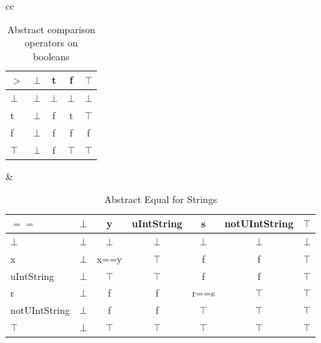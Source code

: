\begin{table}[htbp]
\begin{tabular}{cc}
{\begin{tabular}{l|cccc}
$>$    & $\bot$ & t      & f      & $\top$ \\\hline
$\bot$ & $\bot$ & $\bot$ & $\bot$ & $\bot$ \\
t      & $\bot$ & f      & t      & $\top$ \\
f      & $\bot$ & f      & f      & f \\
$\top$ & $\bot$ & f      & $\top$ & $\top$
\end{tabular}
} &
\end{tabular}
\caption{Abstract comparison operators on booleans}
\end{table}

\begin{table}[htbp]
\centering
\begin{tabular}{l|cccccc}
$==$          & $\bot$ & y      & uIntString & s      & notUIntString & $\top$ \\\hline
$\bot$        & $\bot$ & $\bot$ & $\bot$     & $\bot$ & $\bot$        & $\bot$ \\
x             & $\bot$ & x==y   & $\top$     & f      & f             & $\top$ \\
uIntString    & $\bot$ & $\top$ & $\top$     & f      & f             & $\top$ \\
r             & $\bot$ & f      & f          & r==s   & $\top$        & $\top$ \\
notUIntString & $\bot$ & f      & f          & $\top$ & $\top$        & $\top$ \\
$\top$        & $\bot$ & $\top$ & $\top$     & $\top$ & $\top$        & $\top$
\end{tabular}
\caption{Abstract Equal for Strings}
\label{tab:abstract_equal_string}
\end{table}

